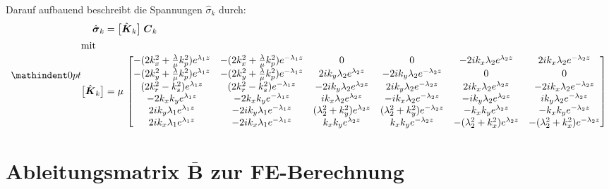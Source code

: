 Darauf aufbauend beschreibt \cite{Mueller2007} die Spannungen \(\hat{\sigma}_{k}\) durch:
\begin{subequations}\label{eq:sigmaHc_block}
	{%
		\setlength{\mathindent}{0pt}
		\begin{align}
			\hat{\boldsymbol{\sigma}}_{k}
			&= \bigl[\hat{\boldsymbol{K}}_{k}\bigr]\;\boldsymbol{C}_{k}
			\label{eq:sigma_equals_KC}\\
			\intertext{mit}
			\bigl[\hat{\boldsymbol{K}}_{k}\bigr]
			&= \mu\,
			\begin{bmatrix}
				-(2k_x^{2}+\tfrac{\lambda}{\mu}k_p^{2})e^{\lambda_{1}z} &
				-(2k_x^{2}+\tfrac{\lambda}{\mu}k_p^{2})e^{-\lambda_{1}z} & 0 & 0 &
				-2i k_x \lambda_{2}e^{\lambda_{2}z} & 2i k_x \lambda_{2}e^{-\lambda_{2}z} \\
				-(2k_y^{2}+\tfrac{\lambda}{\mu}k_p^{2})e^{\lambda_{1}z} &
				-(2k_y^{2}+\tfrac{\lambda}{\mu}k_p^{2})e^{-\lambda_{1}z} &
				2i k_y \lambda_{2}e^{\lambda_{2}z} & -2i k_y \lambda_{2}e^{-\lambda_{2}z} & 0 & 0 \\
				(2k_r^{2}-k_s^{2})e^{\lambda_{1}z} &
				(2k_r^{2}-k_s^{2})e^{-\lambda_{1}z} &
				-2i k_y \lambda_{2}e^{\lambda_{2}z} & 2i k_y \lambda_{2}e^{-\lambda_{2}z} &
				2i k_x \lambda_{2}e^{\lambda_{2}z} & -2i k_x \lambda_{2}e^{-\lambda_{2}z} \\
				-2k_x k_y e^{\lambda_{1}z} & -2k_x k_y e^{-\lambda_{1}z} &
				i k_x \lambda_{2}e^{\lambda_{2}z} & -i k_x \lambda_{2}e^{-\lambda_{2}z} &
				-i k_y \lambda_{2}e^{\lambda_{2}z} & i k_y \lambda_{2}e^{-\lambda_{2}z} \\
				2i k_y \lambda_{1}e^{\lambda_{1}z} & -2i k_y \lambda_{1}e^{-\lambda_{1}z} &
				(\lambda_{2}^{2}+k_y^{2})e^{\lambda_{2}z} & (\lambda_{2}^{2}+k_y^{2})e^{-\lambda_{2}z} &
				-k_x k_y e^{\lambda_{2}z} & -k_x k_y e^{-\lambda_{2}z} \\
				2i k_x \lambda_{1}e^{\lambda_{1}z} & -2i k_x \lambda_{1}e^{-\lambda_{1}z} &
				k_x k_y e^{\lambda_{2}z} & k_x k_y e^{-\lambda_{2}z} &
				-(\lambda_{2}^{2}+k_x^{2})e^{\lambda_{2}z} & -(\lambda_{2}^{2}+k_x^{2})e^{-\lambda_{2}z}
			\end{bmatrix}
			\label{eq:Kk_matrix}
		\end{align}
	}%
\end{subequations}


\section{Ableitungsmatrix \(\bar{\mathbf{B}}\) zur FE-Berechnung}
\label{sec:B_Matrix}

